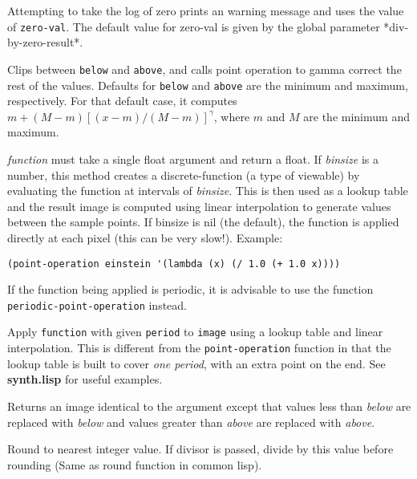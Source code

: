 \begin{description}
\item{}
Attempting to take the log of zero prints an warning message and uses
the value of {\tt zero-val}.  The default value for zero-val is given
by the global parameter *div-by-zero-result*.  

\item{}
Clips between {\tt below} and {\tt above}, and calls point operation
to gamma correct the rest of the values.  Defaults for {\tt below} and
{\tt above} are the minimum and maximum, respectively.  For that
default case, it computes $m + (M-m) [(x-m)/(M-m)]^\gamma$, where $m$
and $M$ are the minimum and maximum.

\item{}
{\em function} must take a single float argument and return a float.
If {\em binsize} is a number, this method creates a discrete-function
(a type of viewable) by evaluating the function at intervals of {\em
binsize}.  This is then used as a lookup table and the result image is
computed using linear interpolation to generate values between the
sample points.  If binsize is nil (the default), the function is
applied directly at each pixel (this can be very slow!).  Example:
\begin{verbatim}
(point-operation einstein '(lambda (x) (/ 1.0 (+ 1.0 x))))
\end{verbatim}
If the function being applied is periodic, it is advisable to use the
function {\tt periodic-point-operation} instead.  

\item{}
Apply {\tt function} with given {\tt period} to {\tt image} using a
lookup table and linear interpolation.  This is different from the
{\tt point-operation} function in that the lookup table is built to
cover {\em one period}, with an extra point on the end.  See {\bf
synth.lisp} for useful examples.

\item{}
Returns an image identical to the argument except that values
less than {\em below} are replaced with {\em below} and values greater
than {\em above} are replaced with {\em above}.

\item{}
Round to nearest integer value.  If divisor is passed, divide by this
value before rounding (Same as round function in common lisp).


\end{description}
